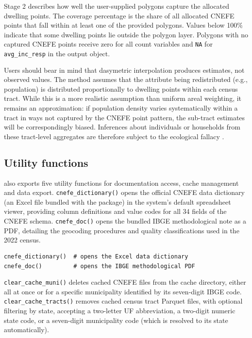 Stage 2 describes how well the user-supplied polygons capture the
allocated dwelling points. The coverage percentage is the share of all
allocated CNEFE points that fall within at least one of the provided
polygons. Values below 100\% indicate that some dwelling points lie
outside the polygon layer. Polygons with no captured CNEFE points
receive zero for all count variables and \texttt{NA} for \texttt{avg\_inc\_resp} in the
output object.

Users should bear in mind that dasymetric interpolation produces
estimates, not observed values. The method assumes that the attribute
being redistributed (e.g., population) is distributed proportionally to
dwelling points within each census tract. While this is a more realistic
assumption than uniform areal weighting, it remains an approximation: if
population density varies systematically within a tract in ways not
captured by the CNEFE point pattern, the sub-tract estimates will be
correspondingly biased. Inferences about individuals or households from
these tract-level aggregates are therefore subject to the ecological
fallacy \citep{robinson1950}.

\subsection{Utility functions}\label{utility-functions}

 also exports five utility functions for documentation
access, cache management and data export. \texttt{cnefe\_dictionary()} opens the official
CNEFE data dictionary (an Excel file bundled with the package) in the
system's default spreadsheet viewer, providing column definitions and
value codes for all 34 fields of the CNEFE schema. \texttt{cnefe\_doc()} opens
the bundled IBGE methodological note \citep{ibge_cnefe2024} as a PDF,
detailing the geocoding procedures and quality classifications used in
the 2022 census.

\begin{verbatim}
cnefe_dictionary()  # opens the Excel data dictionary
cnefe_doc()         # opens the IBGE methodological PDF
\end{verbatim}

\texttt{clear\_cache\_muni()} deletes cached CNEFE files from the cache
directory, either all at once or for a specific municipality identified
by its seven-digit IBGE code. \texttt{clear\_cache\_tracts()} removes cached
census tract Parquet files, with optional filtering by state, accepting
a two-letter UF abbreviation, a two-digit numeric state code, or a
seven-digit municipality code (which is resolved to its state
automatically).

